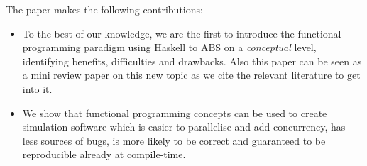 The paper makes the following contributions:

\begin{itemize}
	\item To the best of our knowledge, we are the first to introduce the functional programming paradigm using Haskell to ABS on a \textit{conceptual} level, identifying benefits, difficulties and drawbacks. Also this paper can be seen as a mini review paper on this new topic as we cite the relevant literature to get into it.
	\item We show that functional programming concepts can be used to create simulation software which is easier to parallelise and add concurrency, has less sources of bugs, is more likely to be correct and guaranteed to be reproducible already at compile-time.
\end{itemize}